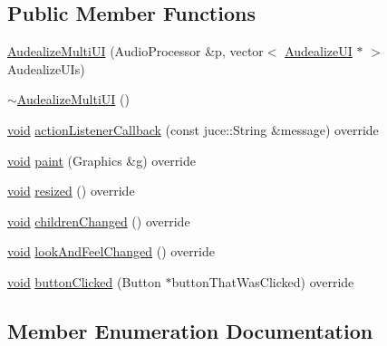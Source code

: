 \subsection*{Public Member Functions}
\begin{DoxyCompactItemize}
\item 
\hyperlink{class_audealize_1_1_audealize_multi_u_i_ac89a054f68a45a9eb6c882b4955a0706}{Audealize\+Multi\+UI} (Audio\+Processor \&p, vector$<$ \hyperlink{class_audealize_1_1_audealize_u_i}{Audealize\+UI} $\ast$ $>$ Audealize\+U\+Is)
\item 
\hyperlink{class_audealize_1_1_audealize_multi_u_i_a7d648ba966c595fec2509e339d27b85e}{$\sim$\+Audealize\+Multi\+UI} ()
\item 
\hyperlink{tk_8h_aba408b7cd755a96426e004c015f5de8e}{void} \hyperlink{class_audealize_1_1_audealize_multi_u_i_a3e535c084b7cf39cf8c84fb101f3aef7}{action\+Listener\+Callback} (const juce\+::\+String \&message) override
\item 
\hyperlink{tk_8h_aba408b7cd755a96426e004c015f5de8e}{void} \hyperlink{class_audealize_1_1_audealize_multi_u_i_a956752a920dbb47b7d33e8b498b59cbf}{paint} (Graphics \&g) override
\item 
\hyperlink{tk_8h_aba408b7cd755a96426e004c015f5de8e}{void} \hyperlink{class_audealize_1_1_audealize_multi_u_i_a56cb38579022ba7a1687935c19ff0f7f}{resized} () override
\item 
\hyperlink{tk_8h_aba408b7cd755a96426e004c015f5de8e}{void} \hyperlink{class_audealize_1_1_audealize_multi_u_i_adaa160f3fcd6bed60331f109f2a23acd}{children\+Changed} () override
\item 
\hyperlink{tk_8h_aba408b7cd755a96426e004c015f5de8e}{void} \hyperlink{class_audealize_1_1_audealize_multi_u_i_aff9e86f204aee21ee4f6fb1dfa1e643f}{look\+And\+Feel\+Changed} () override
\item 
\hyperlink{tk_8h_aba408b7cd755a96426e004c015f5de8e}{void} \hyperlink{class_audealize_1_1_audealize_multi_u_i_aec895e0203ce37db39920602c93177ff}{button\+Clicked} (Button $\ast$button\+That\+Was\+Clicked) override
\end{DoxyCompactItemize}


\subsection{Member Enumeration Documentation}
